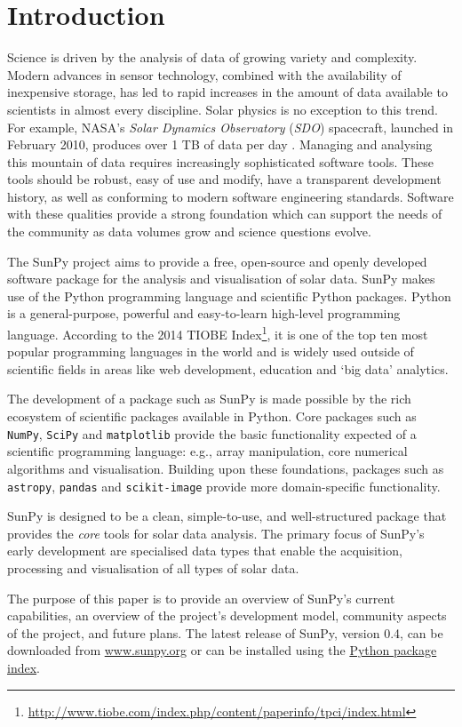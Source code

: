 \section{Introduction}\label{sec:Intro}

Science is driven by the analysis of data of growing variety and complexity.
Modern advances in sensor
technology, combined with the availability of inexpensive storage, has led to
rapid increases in the amount of data available to scientists in almost
every discipline.  Solar physics is no exception to this trend. For example,
NASA's \textit{Solar Dynamics Observatory} (\textit{SDO}) spacecraft, launched 
in February 2010, produces over 1 TB of data per day \citep{aia}. Managing and
analysing this mountain of data requires increasingly sophisticated software 
tools.
These tools should be robust, easy of use and modify, have a transparent 
development history, as well as conforming to modern software engineering 
standards.
Software with these qualities provide a strong foundation which can support the 
needs of the community as data volumes grow and science questions evolve.

The SunPy project aims to provide a free, open-source and openly developed 
software package for the analysis and visualisation of solar data. SunPy makes 
use of the Python programming language and scientific Python packages. Python 
is a general-purpose, powerful and easy-to-learn high-level programming 
language.
According to the 2014 TIOBE 
Index\footnote{\url{http://www.tiobe.com/index.php/content/paperinfo/tpci/index.html}},
it is one of the top ten most popular programming languages in the world 
and is widely used outside of scientific fields in areas like web development, 
education and `big data' analytics.

The development of a package such as SunPy is made possible by the 
rich ecosystem of scientific packages available in Python. Core packages such 
as \texttt{NumPy}, \texttt{SciPy} and \texttt{matplotlib} 
provide the basic functionality expected of a scientific programming language:
e.g., array manipulation, core numerical algorithms and visualisation. 
Building upon these foundations, packages such as \texttt{astropy}, \texttt{pandas} and 
\texttt{scikit-image} provide more domain-specific functionality.

SunPy is designed to be a clean, simple-to-use, and well-structured 
package that provides the \textit{core} tools for solar data analysis. 
The primary focus of SunPy's early development are 
specialised data types that enable the acquisition, processing and 
visualisation of all types of solar data.

The purpose of this paper is to provide an overview of SunPy's current 
capabilities, an overview of the project's development model, community aspects of the 
project, and future plans. The latest release of SunPy, version 0.4,
can be downloaded from \href{http://sunpy.org}{www.sunpy.org} or can be
installed using the \href{http://pypi.python.org/pypi}{Python package index}.
